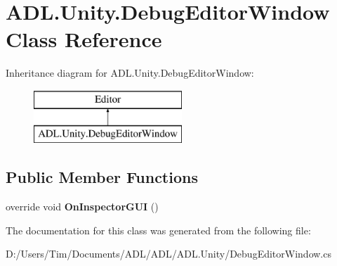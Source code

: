 \hypertarget{class_a_d_l_1_1_unity_1_1_debug_editor_window}{}\section{A\+D\+L.\+Unity.\+Debug\+Editor\+Window Class Reference}
\label{class_a_d_l_1_1_unity_1_1_debug_editor_window}
Inheritance diagram for A\+D\+L.\+Unity.\+Debug\+Editor\+Window\+:\begin{figure}[H]
\begin{center}
\leavevmode
\includegraphics[height=2.000000cm]{class_a_d_l_1_1_unity_1_1_debug_editor_window}
\end{center}
\end{figure}
\subsection*{Public Member Functions}
\begin{DoxyCompactItemize}
\item 
\mbox{\label{class_a_d_l_1_1_unity_1_1_debug_editor_window_ab25bbc6b5b7b8260e76dbf9a781fa815}} 
override void {\bfseries On\+Inspector\+G\+UI} ()
\end{DoxyCompactItemize}


The documentation for this class was generated from the following file\+:\begin{DoxyCompactItemize}
\item 
D\+:/\+Users/\+Tim/\+Documents/\+A\+D\+L/\+A\+D\+L/\+A\+D\+L.\+Unity/Debug\+Editor\+Window.\+cs\end{DoxyCompactItemize}
